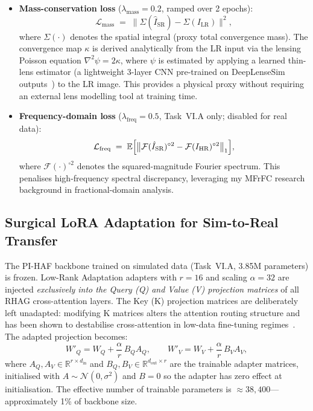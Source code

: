 \documentclass[11pt,a4paper]{article}
\newcommand{\bE}{\mathbb{E}}
\newcommand{\Lmass}{\mathcal{L}_{\text{mass}}}
\newcommand{\Lfreq}{\mathcal{L}_{\text{freq}}}
\begin{document}
\begin{itemize}
  \item \textbf{Mass-conservation loss} ($\lambda_{\text{mass}}=0.2$, ramped over 2 epochs):
    \begin{equation}
      \Lmass \;=\; \bigl\|\Sigma(\hat{I}_{\text{SR}}) - \Sigma(I_{\text{LR}})\bigr\|^2,
    \end{equation}
    where $\Sigma(\cdot)$ denotes the spatial integral (proxy total convergence mass). The convergence map $\kappa$ is derived analytically from the LR input via the lensing Poisson equation $\nabla^2\psi = 2\kappa$, where $\psi$ is estimated by applying a learned thin-lens estimator (a lightweight 3-layer CNN pre-trained on DeepLenseSim outputs~\citep{deeplensesim}) to the LR image. This provides a physical proxy without requiring an external lens modelling tool at training time.

  \item \textbf{Frequency-domain loss} ($\lambda_{\text{freq}}=0.5$, Task~VI.A only; disabled for real data):
    \begin{equation}
      \Lfreq \;=\; \bE\Bigl[\bigl\|\mathcal{F}(\hat{I}_{\text{SR}})^{\circ 2} - \mathcal{F}(I_{\text{HR}})^{\circ 2}\bigr\|_1\Bigr],
    \end{equation}
    where $\mathcal{F}(\cdot)^{\circ 2}$ denotes the squared-magnitude Fourier spectrum. This penalises high-frequency spectral discrepancy, leveraging my MFrFC research background in fractional-domain analysis.
\end{itemize}

\subsection{Surgical LoRA Adaptation for Sim-to-Real Transfer}

The PI-HAF backbone trained on simulated data (Task~VI.A, 3.85M parameters) is frozen. Low-Rank Adaptation adapters with $r=16$ and scaling $\alpha=32$ are injected \emph{exclusively into the Query (Q) and Value (V) projection matrices} of all RHAG cross-attention layers. The Key (K) projection matrices are deliberately left unadapted: modifying K matrices alters the attention routing structure and has been shown to destabilise cross-attention in low-data fine-tuning regimes~\citep{zhu2024}. The adapted projection becomes:
\begin{equation}
  W'_Q = W_Q + \frac{\alpha}{r}\,B_Q A_Q, \qquad W'_V = W_V + \frac{\alpha}{r}\,B_V A_V,
\end{equation}
where $A_Q, A_V \in \mathbb{R}^{r \times d_{\text{in}}}$ and $B_Q, B_V \in \mathbb{R}^{d_{\text{out}} \times r}$ are the trainable adapter matrices, initialised with $A \sim \mathcal{N}(0, \sigma^2)$ and $B = 0$ so the adapter has zero effect at initialisation. The effective number of trainable parameters is $\approx 38{,}400$---approximately 1\% of backbone size.
\end{document}
